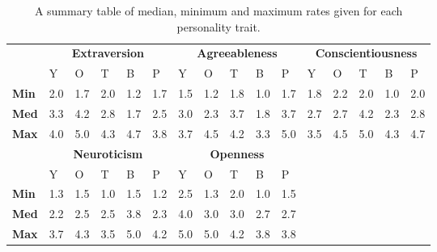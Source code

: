 \begin{table}[H]
    \renewcommand{\arraystretch}{1}
    \begin{center}
        \begin{tabular}{p{}|
        p{}|p{}|p{}|p{}|p{}||
        p{}|p{}|p{}|p{}|p{}||
        p{}|p{}|p{}|p{}|p{}|}
            \cline{2-16}
            & \multicolumn{5}{c||}{\textbf{Extraversion}} & \multicolumn{5}{c||}{\textbf{Agreeableness}}
            & \multicolumn{5}{c|}{\textbf{Conscientiousness}} \\
            \cline{2-16}
            & Y & O & T & B & P & Y & O & T & B & P & Y & O & T & B & P     \\
            \cline{2-16}
            \textbf{Min}    & 2.0 & 1.7 & 2.0 & 1.2 & 1.7 & 1.5 & 1.2 & 1.8 & 1.0 & 1.7 & 1.8 & 2.2 & 2.0 & 1.0 & 2.0  \\
            \textbf{Med}    & 3.3 & 4.2 & 2.8 & 1.7 & 2.5 & 3.0 & 2.3 & 3.7 & 1.8 & 3.7 & 2.7 & 2.7 & 4.2 & 2.3 & 2.8  \\
            \textbf{Max}    & 4.0 & 5.0 & 4.3 & 4.7 & 3.8 & 3.7 & 4.5 & 4.2 & 3.3 & 5.0 & 3.5 & 4.5 & 5.0 & 4.3 & 4.7 \\
            \cline{2-16}
            \cline{2-11}
            &  \multicolumn{5}{|c||}{\textbf{Neuroticism}} & \multicolumn{5}{|c||}{\textbf{Openness}} \\
            \cline{2-11}
            & Y & O & T & B & P & Y & O & T & B & P            \\
            \cline{2-11}
            \textbf{Min}    & 1.3 & 1.5 & 1.0 & 1.5 & 1.2 & 2.5 & 1.3 & 2.0 & 1.0 & 1.5    \\
            \textbf{Med}    & 2.2 & 2.5 & 2.5 & 3.8 & 2.3 & 4.0 & 3.0 & 3.0 & 2.7 & 2.7    \\
            \textbf{Max}    & 3.7 & 4.3 & 3.5 & 5.0 & 4.2 & 5.0 & 5.0 & 4.2 & 3.8 & 3.8    \\
            \cline{2-11}
        \end{tabular}
        \caption[]{A summary table of median, minimum and maximum rates given for each personality trait.\footnotemark}
        \label{table:medianMT1}
    \end{center}
\end{table}

